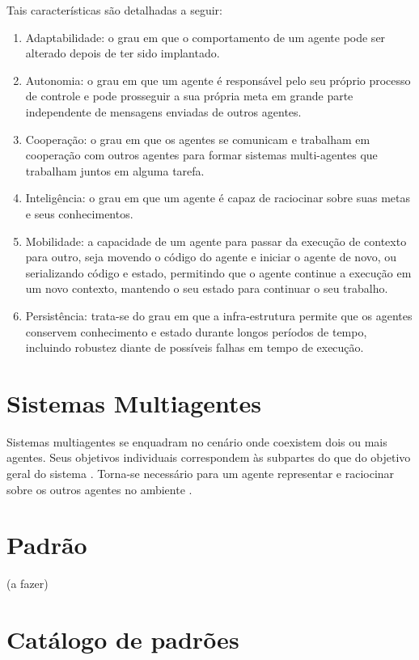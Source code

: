 Tais características são detalhadas a seguir:

\begin{enumerate}
    \item Adaptabilidade: o grau em que o comportamento de um agente pode ser alterado depois de ter sido implantado.
    \item Autonomia: o grau em que um agente é responsável pelo seu próprio processo de controle e pode prosseguir a sua própria meta em grande parte independente de mensagens enviadas de outros agentes.
    \item Cooperação: o grau em que os agentes se comunicam e trabalham em cooperação com outros agentes para formar sistemas multi-agentes que trabalham juntos em alguma tarefa.
    \item Inteligência: o grau em que um agente é capaz de raciocinar sobre suas metas e seus conhecimentos.
    \item Mobilidade: a capacidade de um agente para passar da execução de contexto para outro, seja movendo o código do agente e iniciar o agente de novo, ou serializando código e estado, permitindo que o agente continue a execução em um novo contexto, mantendo o seu estado para continuar o seu trabalho.
    \item Persistência: trata-se do grau em que a infra-estrutura permite que os agentes conservem conhecimento e estado durante longos períodos de tempo, incluindo robustez diante de possíveis falhas em tempo de execução.
\end{enumerate}

\section{Sistemas Multiagentes}

Sistemas multiagentes se enquadram no cenário onde coexistem dois ou mais agentes. Seus objetivos individuais  correspondem às subpartes do que do objetivo geral do sistema \cite{mcarthur2007multi}. Torna-se necessário para um agente representar e raciocinar sobre os outros agentes no ambiente \cite[pág. 887]{van2008handbook}. 


\section{Padrão}

(a fazer)

\section{Catálogo de padrões}

